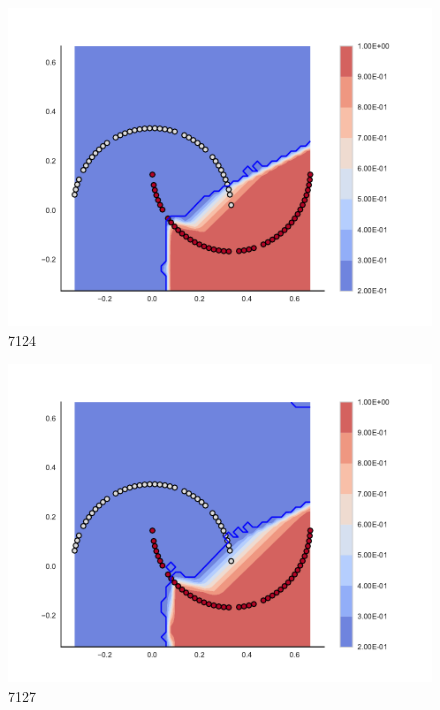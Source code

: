 \begin{subfigure}[b]{0.09\textwidth}
    \includegraphics[clip, trim=2.35cm 1.75cm 4.5cm 0cm,width=\textwidth]{img/convergence/7124.pdf}
    \caption{7124}
    \label{fig:convergence_7124}
\end{subfigure}
%
\begin{subfigure}[b]{0.09\textwidth}
    \includegraphics[clip, trim=2.35cm 1.75cm 4.5cm 0cm,width=\textwidth]{img/convergence/7127.pdf}
    \caption{7127}
    \label{fig:convergence_7127}
\end{subfigure}
%

